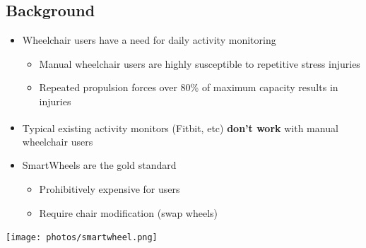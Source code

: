 \documentclass[a0,landscape]{a0poster}
\newenvironment{Figure}
  {\par\medskip\noindent\minipage{\linewidth}}
  {\endminipage\par\medskip}
\begin{document}
\vspace{3cm}

\begin{multicols*}{3}
\large

\section*{Background}
\begin{minipage}[t]{0.55\columnwidth}
    \begin{itemize}
        \item Wheelchair users have a need for daily activity monitoring
            \begin{itemize}
                \item Manual wheelchair users are highly susceptible to repetitive stress injuries \cite{mercer06}
                \item Repeated propulsion forces over 80\% of maximum capacity results in injuries \cite{hills11}
            \end{itemize}
        \item Typical existing activity monitors (Fitbit\textsuperscript{\textregistered}, etc) \textbf{don't work} with manual wheelchair users
        \item SmartWheels are the gold standard \cite{asato93,cowan08}
            \begin{itemize}
                \item Prohibitively expensive for users
                \item Require chair modification (swap wheels)
            \end{itemize}
    \end{itemize}
\end{minipage}
\hspace{0.05\columnwidth}%
\begin{minipage}[t]{0.4\columnwidth}
    \begin{Figure}
        \centering
        \texttt{[image: photos/smartwheel.png]}
        \label{fig:smartwheel}
    \end{Figure}
\end{minipage}


\end{multicols*}
\end{document}
